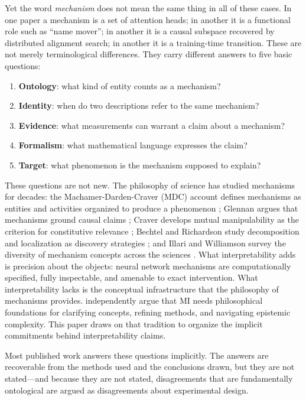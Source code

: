 \documentclass{article}
\begin{document}
Yet the word \emph{mechanism} does not mean the same thing in all of
these cases.  In one paper a mechanism is a set of attention heads;
in another it is a functional role such as ``name mover''; in another
it is a causal subspace recovered by distributed alignment search; in
another it is a training-time transition.  These are not merely
terminological differences.  They carry different answers to five basic
questions:
\begin{enumerate}[leftmargin=*,label=(\arabic*)]
\item \textbf{Ontology}: what kind of entity counts as a mechanism?
\item \textbf{Identity}: when do two descriptions refer to the same mechanism?
\item \textbf{Evidence}: what measurements can warrant a claim about a mechanism?
\item \textbf{Formalism}: what mathematical language expresses the claim?
\item \textbf{Target}: what phenomenon is the mechanism supposed to explain?
\end{enumerate}
These questions are not new.  The philosophy of science has studied
mechanisms for decades: the Machamer-Darden-Craver (MDC) account defines
mechanisms as entities and activities organized to produce a phenomenon
\citep{machamer2000}; Glennan argues that mechanisms ground causal claims
\citep{glennan1996}; Craver develops mutual manipulability as the
criterion for constitutive relevance \citep{craver2007}; Bechtel and
Richardson study decomposition and localization as discovery strategies
\citep{bechtel1993}; and Illari and Williamson survey the diversity of
mechanism concepts across the sciences \citep{illari2012}.  What
interpretability adds is precision about the objects: neural network
mechanisms are computationally specified, fully inspectable, and amenable
to exact intervention.  What interpretability lacks is the conceptual
infrastructure that the philosophy of mechanisms provides.
\citet{williams2025} independently argue that MI needs philosophical
foundations for clarifying concepts, refining methods, and navigating
epistemic complexity.  This paper draws on that tradition to organize
the implicit commitments behind interpretability claims.

Most published work answers these questions implicitly.  The answers are
recoverable from the methods used and the conclusions drawn, but they are
not stated---and because they are not stated, disagreements that are
fundamentally ontological are argued as disagreements about experimental
design.
\end{document}
